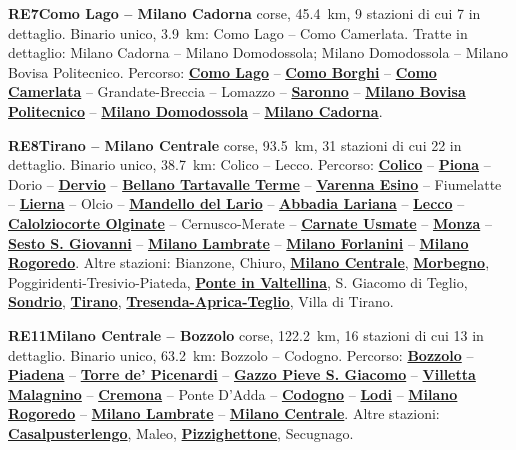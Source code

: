 \medskip\noindent\hypertarget{lin:RE7}{\textbf{RE7\enspace Como Lago -- Milano Cadorna}} corse, \SI{45,4}{\km}, 9 stazioni di cui 7 in dettaglio. Binario unico, \SI{3,9}{\km}: Como Lago -- Como Camerlata. Tratte in dettaglio: Milano Cadorna -- Milano Domodossola; Milano Domodossola -- Milano Bovisa Politecnico. Percorso: \hyperlink{sta:S01765}{\textbf{Como Lago}} -- \hyperlink{sta:S01764}{\textbf{Como Borghi}} -- \hyperlink{sta:S09998}{\textbf{Como Camerlata}} -- Grandate-Breccia -- Lomazzo -- \hyperlink{sta:S01933}{\textbf{Saronno}} -- \hyperlink{sta:S01642}{\textbf{Milano Bovisa Politecnico}} -- \hyperlink{sta:S01067}{\textbf{Milano Domodossola}} -- \hyperlink{sta:S01066}{\textbf{Milano Cadorna}}.

\medskip\noindent\hypertarget{lin:RE8}{\textbf{RE8\enspace Tirano -- Milano Centrale}} corse, \SI{93,5}{\km}, 31 stazioni di cui 22 in dettaglio. Binario unico, \SI{38,7}{\km}: Colico -- Lecco. Percorso: \hyperlink{sta:S01420}{\textbf{Colico}} -- \hyperlink{sta:S01406}{\textbf{Piona}} -- Dorio -- \hyperlink{sta:S01408}{\textbf{Dervio}} -- \hyperlink{sta:S01409}{\textbf{Bellano Tartavalle Terme}} -- \hyperlink{sta:S01411}{\textbf{Varenna Esino}} -- Fiumelatte -- \hyperlink{sta:S01413}{\textbf{Lierna}} -- Olcio -- \hyperlink{sta:S01415}{\textbf{Mandello del Lario}} -- \hyperlink{sta:S01416}{\textbf{Abbadia Lariana}} -- \hyperlink{sta:S01520}{\textbf{Lecco}} -- \hyperlink{sta:S01524}{\textbf{Calolziocorte Olginate}} -- Cernusco-Merate -- \hyperlink{sta:S01511}{\textbf{Carnate Usmate}} -- \hyperlink{sta:S01322}{\textbf{Monza}} -- \hyperlink{sta:S01325}{\textbf{Sesto S. Giovanni}} -- \hyperlink{sta:S01701}{\textbf{Milano Lambrate}} -- \hyperlink{sta:S01492}{\textbf{Milano Forlanini}} -- \hyperlink{sta:S01820}{\textbf{Milano Rogoredo}}. Altre stazioni: Bianzone, Chiuro, \hyperlink{sta:S01700}{\textbf{Milano Centrale}}, \hyperlink{sta:S01425}{\textbf{Morbegno}}, Poggiridenti-Tresivio-Piateda, \hyperlink{sta:S01434}{\textbf{Ponte in Valtellina}}, S. Giacomo di Teglio, \hyperlink{sta:S01430}{\textbf{Sondrio}}, \hyperlink{sta:S01440}{\textbf{Tirano}}, \hyperlink{sta:S01437}{\textbf{Tresenda-Aprica-Teglio}}, Villa di Tirano.

\medskip\noindent\hypertarget{lin:RE11}{\textbf{RE11\enspace Milano Centrale -- Bozzolo}} corse, \SI{122,2}{\km}, 16 stazioni di cui 13 in dettaglio. Binario unico, \SI{63,2}{\km}: Bozzolo -- Codogno. Percorso: \hyperlink{sta:S01920}{\textbf{Bozzolo}} -- \hyperlink{sta:S01919}{\textbf{Piadena}} -- \hyperlink{sta:S01918}{\textbf{Torre de' Picenardi}} -- \hyperlink{sta:S01917}{\textbf{Gazzo Pieve S. Giacomo}} -- \hyperlink{sta:S01916}{\textbf{Villetta Malagnino}} -- \hyperlink{sta:S01915}{\textbf{Cremona}} -- Ponte D'Adda -- \hyperlink{sta:S01828}{\textbf{Codogno}} -- \hyperlink{sta:S01825}{\textbf{Lodi}} -- \hyperlink{sta:S01820}{\textbf{Milano Rogoredo}} -- \hyperlink{sta:S01701}{\textbf{Milano Lambrate}} -- \hyperlink{sta:S01700}{\textbf{Milano Centrale}}. Altre stazioni: \hyperlink{sta:S01827}{\textbf{Casalpusterlengo}}, Maleo, \hyperlink{sta:S01911}{\textbf{Pizzighettone}}, Secugnago.

